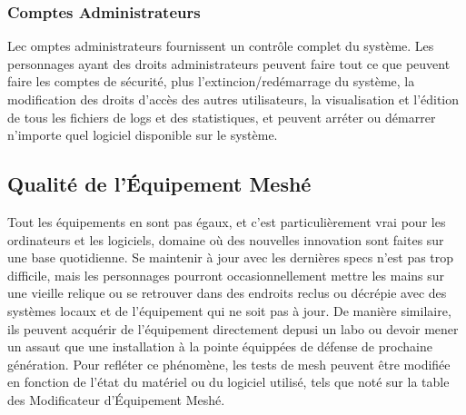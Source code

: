 \subsubsection{Comptes Administrateurs} 

Lec omptes administrateurs fournissent un contrôle complet du système. Les personnages ayant des droits administrateurs peuvent faire tout ce que peuvent faire les comptes de sécurité, plus l'extincion/redémarrage du système, la modification des droits d'accès des autres utilisateurs, la visualisation et l'édition de tous les fichiers de logs et des statistiques, et peuvent arréter ou démarrer n'importe quel logiciel disponible sur le système. 

\subsection{Qualité de l'Équipement Meshé} 

Tout les équipements en sont pas égaux, et c'est particulièrement vrai pour les ordinateurs et les logiciels, domaine où des nouvelles innovation sont faites sur une base quotidienne. Se maintenir à jour avec les dernières specs n'est pas trop difficile, mais les personnages pourront occasionnellement mettre les mains sur une vieille relique ou se retrouver dans des endroits reclus ou décrépie avec des systèmes locaux et de l'équipement qui ne soit pas à jour. De manière similaire, ils peuvent acquérir de l'équipement directement depusi un labo ou devoir mener un assaut que une installation à la pointe équippées de défense de prochaine génération. Pour refléter ce phénomène, les tests de mesh peuvent être modifiée en fonction de l'état du matériel ou du logiciel utilisé, tels que noté sur la table des Modificateur d'Équipement Meshé. 

